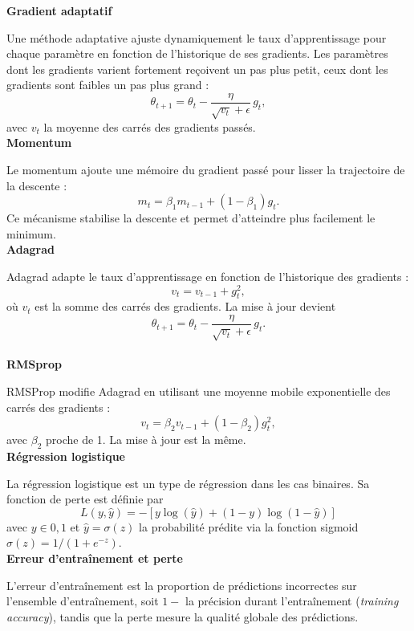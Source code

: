 \documentclass[a4paper,12pt]{article}
\begin{document}
\noindent\textbf{Gradient adaptatif}\\
\par Une méthode adaptative ajuste dynamiquement le taux d’apprentissage
pour chaque paramètre en fonction de l’historique de ses gradients.
Les paramètres dont les gradients varient fortement reçoivent un pas plus
petit, ceux dont les gradients sont faibles un pas plus grand :
\[
\theta_{t+1} = \theta_t - \frac{\eta}{\sqrt{v_t} + \epsilon} \, g_t,
\]
avec $v_t$ la moyenne des carrés des gradients passés.\\

\noindent\textbf{Momentum}\\
\par Le momentum ajoute une mémoire du gradient passé pour lisser la
trajectoire de la descente :
\[
m_t = \beta_1 m_{t-1} + (1 - \beta_1) g_t.
\]
Ce mécanisme stabilise la descente et permet d’atteindre plus facilement le minimum.\\

\noindent\textbf{Adagrad}\\
\par Adagrad adapte le taux d’apprentissage en fonction de l’historique des
gradients :
\[v_t = v_{t-1} + g_t^2,
\]
où $v_t$ est la somme des carrés des gradients. La mise à jour devient
\[\theta_{t+1} = \theta_t - \frac{\eta}{\sqrt{v_t} + \epsilon} \, g_t.
\] \\

\noindent\textbf{RMSprop}\\
\par RMSProp modifie Adagrad en utilisant une moyenne mobile exponentielle
des carrés des gradients :
\[v_t = \beta_2 v_{t-1} + (1 - \beta_2) g_t^2,
\]
avec $\beta_2$ proche de 1. La mise à jour est la même.\\

\noindent\textbf{Régression logistique}\\
\par La régression logistique est un type de régression dans les cas binaires. Sa fonction de perte est définie par 
$$
L(y, \hat{y}) = -[y \log(\hat{y}) + (1-y) \log(1-\hat{y})]
$$  
avec $y\in{0,1}$ et $\hat{y}=\sigma(z)$ la probabilité prédite via la fonction sigmoid $\sigma(z) = 1/(1 + e^{-z})$. \\

\noindent\textbf{Erreur d'entraînement et perte}\\
\par L'erreur d'entraînement est la proportion de prédictions incorrectes sur l'ensemble d'entraînement, soit $1-$ la précision durant l'entraînement (\textit{training accuracy}), tandis que la perte mesure la qualité globale des prédictions.\\
\end{document}

